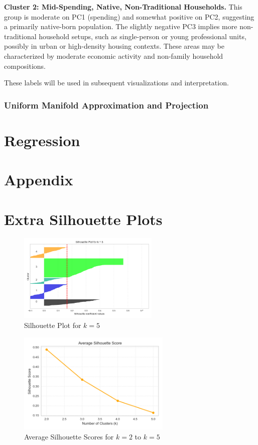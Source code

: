 \documentclass{article}
\begin{document}
\textbf{Cluster 2: Mid-Spending, Native, Non-Traditional Households.}  
This group is moderate on PC1 (spending) and somewhat positive on PC2, suggesting a primarily native-born population. The slightly negative PC3 implies more non-traditional household setups, such as single-person or young professional units, possibly in urban or high-density housing contexts. These areas may be characterized by moderate economic activity and non-family household compositions.

These labels will be used in subsequent visualizations and interpretation.

\subsubsection{Uniform Manifold Approximation and Projection}

\section{Regression}

\appendix
\section*{Appendix}
\section{Extra Silhouette Plots}

\begin{figure}[H]
    \centering
    \includegraphics[width=0.6\textwidth]{figures/silhouette_k5.png}
    \caption{Silhouette Plot for $k=5$}
    \label{fig:silhouette_k5}
\end{figure}

\begin{figure}[H]
    \centering
    \includegraphics[width=0.65\textwidth]{figures/silhouette_scores.png}
    \caption{Average Silhouette Scores for $k=2$ to $k=5$}
    \label{fig:silhouette_scores}
\end{figure}
\end{document}
